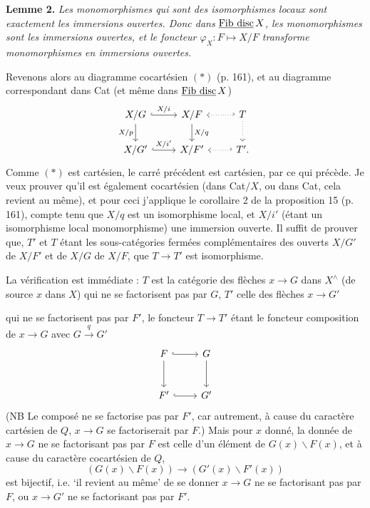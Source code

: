 \textbf{Lemme 2.} \textit{Les monomorphismes qui sont des isomorphismes locaux sont exactement les immersions ouvertes. Donc dans} $\underline{\mathrm{Fib\ disc}}\, X$\textit{, les monomorphismes sont les immersions ouvertes, et le foncteur $\varphi_X : F \longmapsto X/F$ transforme monomorphismes en immersions ouvertes.}

Revenons alors au diagramme cocartésien $(*)$ (p. 161), et au diagramme correspondant dans Cat (et même dans $\underline{\mathrm{Fib\ disc}}\, X$)
\[
\begin{tikzcd}
X/G \ar[r, hook, "X/i"] \ar[d, "X/p"'] & X/F \ar[d, "X/q"] & T \ar[l, hook', dotted] \ar[d, dotted] \\
X/G' \ar[r, hook, "X/i'"] & X/F' & T'. \ar[l, hook', dotted]
\end{tikzcd}
\]
Comme $(*)$ est cartésien, le carré précédent est cartésien, par ce qui précède. Je veux prouver qu'il est également cocartésien
(dans Cat$/X$, ou dans Cat, cela revient au même), et pour ceci j'applique le corollaire 2 de la proposition 15 (p. 161), compte tenu que $X/q$ est un isomorphisme local, et $X/i'$ (étant un isomorphisme local monomorphisme) une immersion ouverte. Il suffit de prouver que, $T'$ et $T$ étant les sous-catégories fermées complémentaires des ouverts $X/G'$ de $X/F'$ et de $X/G$ de $X/F$, que $T \longrightarrow T'$ est isomorphisme.

{\small} %

La vérification est immédiate : $T$ est la catégorie des flèches $x \longrightarrow G$ dans $X^{\wedge}$ (de source $x$ dans $X$) qui ne se factorisent pas par $G$, $T'$ celle des flèches $x \longrightarrow G'$

qui ne se factorisent pas par $F'$, le foncteur $T \longrightarrow T'$ étant le foncteur composition de $x \longrightarrow G$ avec $G \xrightarrow{q} G'$
\[
\begin{tikzcd}[row sep=large]
F \arrow[r, hook] \arrow[d] & G \arrow[d] \\
F' \arrow[r, hook] & G'
\end{tikzcd}
\]
(NB Le composé ne se factorise pas par $F'$, car autrement, à cause du caractère cartésien de $Q$, $x \longrightarrow G$ se factoriserait par $F$.) Mais pour $x$ donné, la donnée de $x \longrightarrow G$ ne se factorisant pas par $F$ est celle d’un élément  de $G(x)\backslash F(x)$, et à cause du caractère cocartésien de $Q$,
\[
(G(x)\backslash F(x)) \longrightarrow (G'(x)\backslash F'(x))
\]
est bijectif, i.e. ‘il revient au même’ de se donner $x \longrightarrow G$ ne se factorisant pas par $F$, ou $x \longrightarrow G'$ ne se factorisant pas par $F'$.

